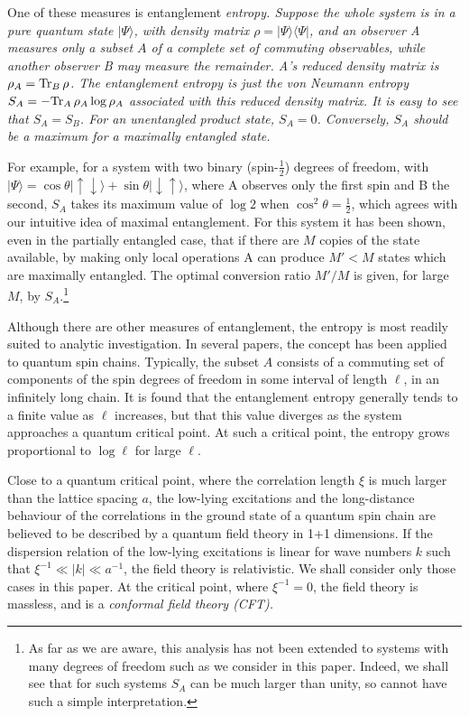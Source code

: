 \documentclass[12pt,aps]{revtex4}
\begin{document}
One of these measures\cite{Bennett}
is entanglement \em entropy\em. Suppose the whole
system is in a pure quantum state $|\Psi\rangle$, with density matrix
$\rho=|\Psi\rangle\langle\Psi|$, and an observer A measures only a
subset $A$ of a complete set of commuting observables, while another
observer B may measure the remainder. A's reduced density matrix is
$\rho_A={\rm Tr}_B\,\rho$. The entanglement entropy is just the von
Neumann entropy $S_A=-{\rm Tr}_A\,\rho_A\log\rho_A$ associated with this
reduced density matrix. It is easy to see that $S_A=S_B$. For an
unentangled product state, $S_A=0$. Conversely, $S_A$ should be a
maximum for a maximally entangled state.

For example, for a system with
two binary (spin-$\frac12$) degrees of freedom, with
$|\Psi\rangle=\cos\theta|\uparrow\downarrow\rangle+\sin\theta|\downarrow
\uparrow\rangle$, where A observes only the first spin and B the second,
$S_A$ takes its maximum value of $\log 2$ when $\cos^2\theta=\frac12$, which
agrees with our intuitive idea of maximal entanglement.
For this system it has been shown,\cite{Bennett} even in the partially
entangled case, that if there are $M$
copies of the state available, by making only local operations A can
produce $M'<M$ states which are maximally entangled. The optimal
conversion ratio $M'/M$ is given, for large $M$, by $S_A$.\footnote{As
far as we are aware, this analysis has not been extended to systems with
many degrees of freedom such as we consider in this paper. Indeed, we
shall see that for such systems $S_A$ can be much larger than unity, so
cannot have such a simple interpretation.}

Although there are other measures of entanglement,\cite{othermeasures}
the entropy is most readily suited to analytic investigation.
In several papers\cite{Vidal,Korepin,leb,Casini},
the concept has been applied to quantum spin chains.
Typically, the subset $A$ consists of a commuting set of components of
the spin degrees of freedom in some interval of length $\ell$, in an
infinitely long chain. It is found that the entanglement entropy
generally tends to a finite value as $\ell$ increases, but that this
value diverges as the system approaches a quantum critical point.
At such a critical point, the entropy grows proportional to $\log\ell$
for large $\ell$.

Close to a quantum critical point, where the correlation length $\xi$ is
much larger than the lattice spacing $a$, the low-lying excitations and
the long-distance behaviour of the correlations in the ground state of
a quantum spin chain are believed to be described by a quantum field
theory in 1+1 dimensions.
If the dispersion relation of the low-lying excitations is linear for
wave numbers $k$ such that $\xi^{-1}\ll|k|\ll a^{-1}$, the field theory
is relativistic. We shall consider only those cases in this paper.
At the critical point, where $\xi^{-1}=0$, the field theory is massless,
and is a \em conformal \em field theory (CFT).
\end{document}
